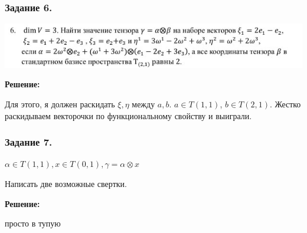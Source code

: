 \subsubsection{Задание 6.}

\begin{center}
   \includegraphics{assets/practice-2-task-6.jpg}
\end{center}

\textbf{Решение:}

Для этого, я должен раскидать $\xi,\eta$ между $a,b$. $a\in T(1,1)$, $b\in T(2,1)$. Жестко раскидываем векторочки по функциональному свойству и выиграли.


\subsubsection{Задание 7.}

$\alpha \in T(1,1), x \in T(0,1), \gamma = \alpha \otimes x$

Написать две возможные свертки.

\textbf{Решение:}

просто в тупую



